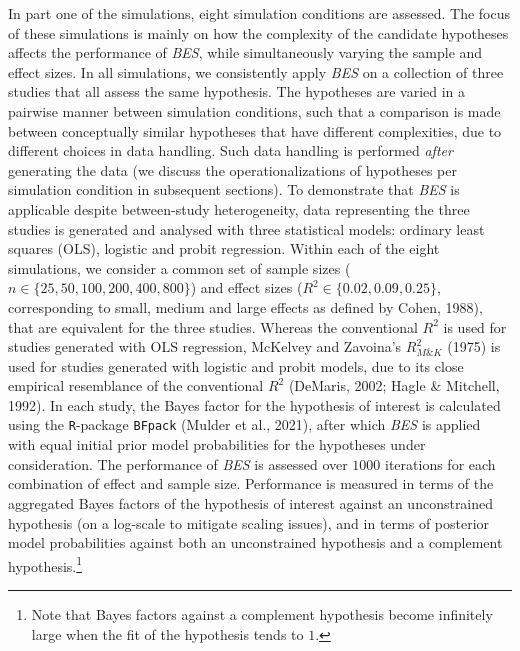 \documentclass[
]{interact}
\begin{document}
In part one of the simulations, eight simulation conditions are
assessed. The focus of these simulations is mainly on how the complexity
of the candidate hypotheses affects the performance of \emph{BES}, while
simultaneously varying the sample and effect sizes. In all simulations,
we consistently apply \emph{BES} on a collection of three studies that
all assess the same hypothesis. The hypotheses are varied in a pairwise
manner between simulation conditions, such that a comparison is made
between conceptually similar hypotheses that have different
complexities, due to different choices in data handling. Such data
handling is performed \emph{after} generating the data (we discuss the
                                                        operationalizations of hypotheses per simulation condition in subsequent
                                                        sections). To demonstrate that \emph{BES} is applicable despite
between-study heterogeneity, data representing the three studies is
generated and analysed with three statistical models: ordinary least
squares (OLS), logistic and probit regression. Within each of the eight
simulations, we consider a common set of sample sizes
(\(n \in \{25, 50, 100, 200, 400, 800\}\)) and effect sizes
(\(R^2 \in \{0.02, 0.09, 0.25\}\), corresponding to small, medium and
  large effects as defined by Cohen, 1988), that are equivalent for the
three studies. Whereas the conventional \(R^2\) is used for studies
generated with OLS regression, McKelvey and Zavoina's \(R^2_{M\&K}\)
(1975) is used for studies generated with logistic and probit models,
due to its close empirical resemblance of the conventional \(R^2\)
(DeMaris, 2002; Hagle \& Mitchell, 1992). In each study, the Bayes
factor for the hypothesis of interest is calculated using the
\texttt{R}-package \texttt{BFpack} (Mulder et al., 2021), after which
\emph{BES} is applied with equal initial prior model probabilities for
the hypotheses under consideration. The performance of \emph{BES} is
assessed over \(1000\) iterations for each combination of effect and
sample size. Performance is measured in terms of the aggregated Bayes
factors of the hypothesis of interest against an unconstrained
hypothesis (on a log-scale to mitigate scaling issues), and in terms of
posterior model probabilities against both an unconstrained hypothesis
and a complement hypothesis.\footnote{Note that Bayes factors against a
  complement hypothesis become infinitely large when the fit of the
  hypothesis tends to \(1\).}
\end{document}
